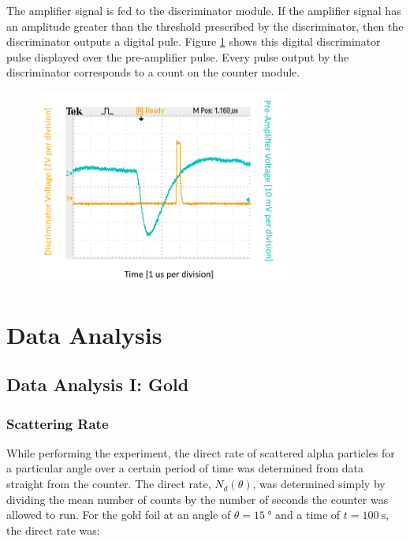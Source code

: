 \documentclass[a4paper]{article}
\begin{document}
The amplifier signal is fed to the discriminator module. If the amplifier signal has an amplitude greater than the threshold prescribed by the discriminator, then the discriminator outputs a digital pule. Figure \ref{preamp_discrim} shows this digital discriminator pulse displayed over the pre-amplifier pulse. Every pulse output by the discriminator corresponds to a count on the counter module.

\begin{figure}[H]
\centering
\includegraphics[width=0.75\textwidth]{ch2preamp_ch1discrim_gain20_maybe4mVthreshold/preamp_discrim.png}
\label{preamp_discrim}
\end{figure}

\section{Data Analysis}

\subsection{Data Analysis I: Gold}

\subsubsection{Scattering Rate}

\qq While performing the experiment, the direct rate of scattered alpha
particles for a particular angle over a certain period of time was determined
from data straight from the counter. The direct rate, \( N_d (\theta) \), was
determined simply by dividing the mean number of counts by the number of seconds
the counter was allowed to run. For the gold foil at an angle of
\( \theta = \SI{15}{\degree} \) and a time of \( t = \SI{100}{\second} \), the
direct rate was:
\end{document}
